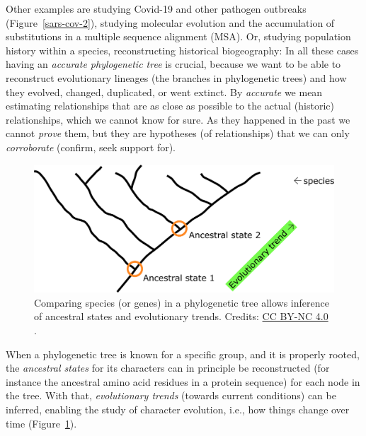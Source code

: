 Other examples are studying Covid-19 and other pathogen outbreaks (Figure~\ref{sars-cov-2}), studying molecular evolution and the accumulation of substitutions in a multiple sequence alignment (MSA).
Or, studying population history within a species, reconstructing historical biogeography: In all these cases having an \textit{accurate phylogenetic tree} is crucial, because we want to be able to reconstruct evolutionary lineages (the branches in phylogenetic trees) and how they evolved, changed, duplicated, or went extinct.
By \textit{accurate} we mean estimating relationships that are as close as possible to the actual (historic) relationships, which we cannot know for sure.
As they happened in the past we cannot \textit{prove} them, but they are hypotheses (of relationships) that we can only \textit{corroborate} (confirm, seek support for).

% 

\begin{figure}[!htbp]
\centering
\includegraphics[width=1\linewidth]{files/ancestral-states_alt-7d2c296e2211f343a7dbc95928147ca9.pdf}
\caption[]{Comparing species (or genes) in a phylogenetic tree allows inference of ancestral states and evolutionary trends.
Credits: \href{https://creativecommons.org/licenses/by-nc/4.0/}{CC BY-NC 4.0} \cite{own_3_2024}.}
\label{ancestral_states_alt}
\end{figure}

When a phylogenetic tree is known for a specific group, and it is properly rooted, the \textit{ancestral states} for its characters can in principle be reconstructed (for instance the ancestral amino acid residues in a protein sequence) for each node in the tree.
With that, \textit{evolutionary trends} (towards current conditions) can be inferred, enabling the study of character evolution, i.e., how things change over time (Figure~\ref{ancestral_states_alt}).



